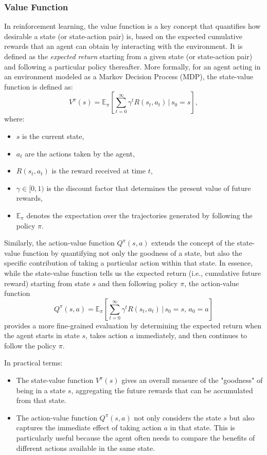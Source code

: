 \documentclass[12pt,a4paper,twoside,openany]{book}
\begin{document}
\subsubsection*{Value Function}
In reinforcement learning, the value function is a key concept that quantifies how desirable a state (or state-action pair) is, based on the expected cumulative rewards that an agent can obtain by interacting with the environment. It is defined as the \emph{expected return} starting from a given state (or state-action pair) and following a particular policy thereafter.
\medskip
More formally, for an agent acting in an environment modeled as a Markov Decision Process (MDP), the state-value function is defined as:
\[
V^\pi(s) = \mathbb{E}_\pi \left[ \sum_{t=0}^{\infty} \gamma^t R(s_t, a_t) \,\Big|\, s_0 = s \right],
\]
where:
\begin{itemize}
    \item \(s\) is the current state,
    \item \(a_t\) are the actions taken by the agent,
    \item \(R(s_t, a_t)\) is the reward received at time \(t\),
    \item \(\gamma \in [0,1)\) is the discount factor that determines the present value of future rewards,
    \item \(\mathbb{E}_\pi\) denotes the expectation over the trajectories generated by following the policy \(\pi\).
\end{itemize}
\medskip
Similarly, the action-value function \(Q^\pi(s,a)\) extends the concept of the state-value function by quantifying not only the goodness of a state, but also the specific contribution of taking a particular action within that state. In essence, while the state-value function tells us the expected return (i.e., cumulative future reward) starting from state \(s\) and then following policy \(\pi\), the action-value function
\[
Q^\pi(s,a) = \mathbb{E}_\pi \left[ \sum_{t=0}^{\infty} \gamma^t R(s_t, a_t) \,\Big|\, s_0 = s,\, a_0 = a \right]
\]
provides a more fine-grained evaluation by determining the expected return when the agent starts in state \(s\), takes action \(a\) immediately, and then continues to follow the policy \(\pi\).


In practical terms:
\begin{itemize}
    \item The state-value function \(V^\pi(s)\) gives an overall measure of the "goodness" of being in a state \(s\), aggregating the future rewards that can be accumulated from that state.
    \item The action-value function \(Q^\pi(s,a)\) not only considers the state \(s\) but also captures the immediate effect of taking action \(a\) in that state. This is particularly useful because the agent often needs to compare the benefits of different actions available in the same state.
\end{itemize}
\end{document}
